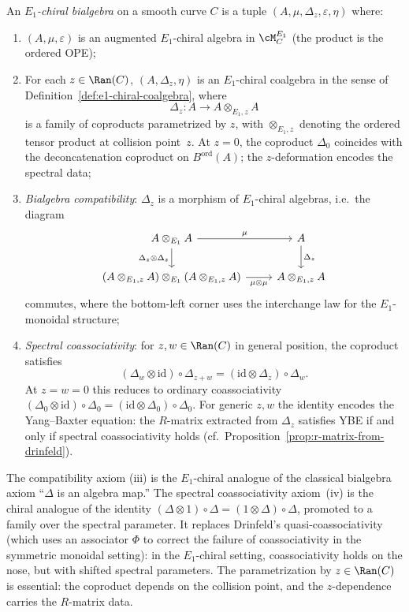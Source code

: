 \begin{definition}
\label{def:e1-chiral-bialgebra}
An \emph{$E_1$-chiral bialgebra} on a smooth curve $C$ is
a tuple $(A, \mu, \Delta_z, \varepsilon, \eta)$ where:
\begin{enumerate}[label=(\roman*)]
 \item $(A, \mu, \varepsilon)$ is an augmented $E_1$-chiral algebra in
 $\cM^{E_1}_C$ (the product is the ordered OPE);
 \item For each $z \in \Ran(C)$, $(A, \Delta_z, \eta)$ is an
 $E_1$-chiral coalgebra in the sense of
 Definition~\ref{def:e1-chiral-coalgebra}, where
 \[
 \Delta_z \colon A \longrightarrow A \otimes_{E_1, z} A
 \]
 is a family of coproducts parametrized by $z$, with
 $\otimes_{E_1, z}$ denoting the ordered tensor product at collision
 point~$z$. At $z = 0$, the coproduct $\Delta_0$ coincides with
 the deconcatenation coproduct on $B^{\mathrm{ord}}(A)$; the
 $z$-deformation encodes the spectral data;
 \item \emph{Bialgebra compatibility}: $\Delta_z$ is a morphism of
 $E_1$-chiral algebras, i.e.\ the diagram
 \[
 \begin{tikzcd}
 A \otimes_{E_1} A \ar[r, "\mu"] \ar[d, "\Delta_z \otimes \Delta_z"']
 & A \ar[d, "\Delta_z"] \\
 (A \otimes_{E_1,z} A) \otimes_{E_1} (A \otimes_{E_1,z} A)
 \ar[r, "\mu \otimes \mu"']
 & A \otimes_{E_1,z} A
 \end{tikzcd}
 \]
 commutes, where the bottom-left corner uses the interchange law
 for the $E_1$-monoidal structure;
 \item \emph{Spectral coassociativity}: for $z, w \in \Ran(C)$ in
 general position, the coproduct satisfies
 \begin{equation}\label{eq:spectral-coassociativity}
 (\Delta_w \otimes \mathrm{id}) \circ \Delta_{z+w}
 = (\mathrm{id} \otimes \Delta_z) \circ \Delta_w.
 \end{equation}
 At $z = w = 0$ this reduces to ordinary coassociativity
 $(\Delta_0 \otimes \mathrm{id}) \circ \Delta_0
 = (\mathrm{id} \otimes \Delta_0) \circ \Delta_0$.
 For generic $z, w$ the identity encodes the Yang--Baxter
 equation: the $R$-matrix extracted from $\Delta_z$ satisfies
 YBE if and only if spectral coassociativity holds
 (cf.\ Proposition~\ref{prop:r-matrix-from-drinfeld}).
\end{enumerate}
The compatibility axiom (iii) is the $E_1$-chiral analogue of the
classical bialgebra axiom ``$\Delta$ is an algebra map.'' The spectral
coassociativity axiom~(iv) is the chiral analogue of the identity
$(\Delta \otimes 1) \circ \Delta = (1 \otimes \Delta) \circ \Delta$,
promoted to a family over the spectral parameter. It replaces
Drinfeld's quasi-coassociativity (which uses an associator $\Phi$ to
correct the failure of coassociativity in the symmetric monoidal setting):
in the $E_1$-chiral setting, coassociativity holds on the nose, but
with shifted spectral parameters. The parametrization
by $z \in \Ran(C)$ is essential: the coproduct depends on the collision
point, and the $z$-dependence carries the $R$-matrix data.
\end{definition}

